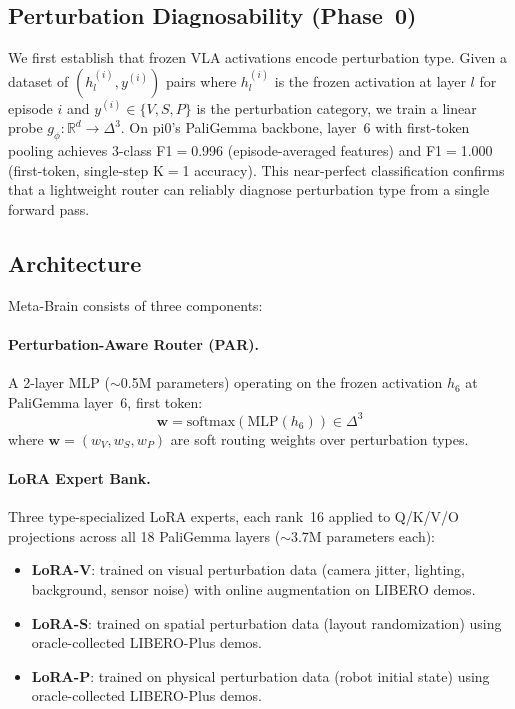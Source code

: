 \documentclass[10pt,twocolumn]{article}
\begin{document}
\subsection{Perturbation Diagnosability (Phase~0)}

We first establish that frozen VLA activations encode perturbation type.
Given a dataset of $(h_l^{(i)}, y^{(i)})$ pairs where $h_l^{(i)}$ is the frozen activation at layer $l$ for episode $i$ and $y^{(i)} \in \{V, S, P\}$ is the perturbation category, we train a linear probe $g_\phi: \mathbb{R}^d \to \Delta^3$.
On pi0's PaliGemma backbone, layer~6 with first-token pooling achieves 3-class F1$=$0.996 (episode-averaged features) and F1$=$1.000 (first-token, single-step K$=$1 accuracy).
This near-perfect classification confirms that a lightweight router can reliably diagnose perturbation type from a single forward pass.

\subsection{Architecture}

Meta-Brain consists of three components:

\paragraph{Perturbation-Aware Router (PAR).}
A 2-layer MLP (${\sim}$0.5M parameters) operating on the frozen activation $h_6$ at PaliGemma layer~6, first token:
\begin{equation}
    \mathbf{w} = \text{softmax}(\text{MLP}(h_6)) \in \Delta^3
\end{equation}
where $\mathbf{w} = (w_V, w_S, w_P)$ are soft routing weights over perturbation types.

\paragraph{LoRA Expert Bank.}
Three type-specialized LoRA experts, each rank~16 applied to Q/K/V/O projections across all 18 PaliGemma layers (${\sim}$3.7M parameters each):
\begin{itemize}
    \item \textbf{LoRA-V}: trained on visual perturbation data (camera jitter, lighting, background, sensor noise) with online augmentation on LIBERO demos.
    \item \textbf{LoRA-S}: trained on spatial perturbation data (layout randomization) using oracle-collected LIBERO-Plus demos.
    \item \textbf{LoRA-P}: trained on physical perturbation data (robot initial state) using oracle-collected LIBERO-Plus demos.
\end{itemize}
\end{document}
